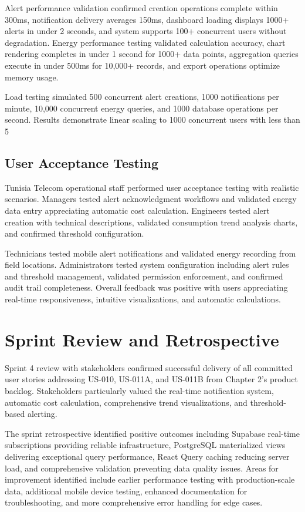 Alert performance validation confirmed creation operations complete within 300ms, notification delivery averages 150ms, dashboard loading displays 1000+ alerts in under 2 seconds, and system supports 100+ concurrent users without degradation. Energy performance testing validated calculation accuracy, chart rendering completes in under 1 second for 1000+ data points, aggregation queries execute in under 500ms for 10,000+ records, and export operations optimize memory usage.

Load testing simulated 500 concurrent alert creations, 1000 notifications per minute, 10,000 concurrent energy queries, and 1000 database operations per second. Results demonstrate linear scaling to 1000 concurrent users with less than 5%

\subsection{User Acceptance Testing}

Tunisia Telecom operational staff performed user acceptance testing with realistic scenarios. Managers tested alert acknowledgment workflows and validated energy data entry appreciating automatic cost calculation. Engineers tested alert creation with technical descriptions, validated consumption trend analysis charts, and confirmed threshold configuration.

Technicians tested mobile alert notifications and validated energy recording from field locations. Administrators tested system configuration including alert rules and threshold management, validated permission enforcement, and confirmed audit trail completeness. Overall feedback was positive with users appreciating real-time responsiveness, intuitive visualizations, and automatic calculations.

\section{Sprint Review and Retrospective}

Sprint 4 review with stakeholders confirmed successful delivery of all committed user stories addressing US-010, US-011A, and US-011B from Chapter 2's product backlog. Stakeholders particularly valued the real-time notification system, automatic cost calculation, comprehensive trend visualizations, and threshold-based alerting.

The sprint retrospective identified positive outcomes including Supabase real-time subscriptions providing reliable infrastructure, PostgreSQL materialized views delivering exceptional query performance, React Query caching reducing server load, and comprehensive validation preventing data quality issues. Areas for improvement identified include earlier performance testing with production-scale data, additional mobile device testing, enhanced documentation for troubleshooting, and more comprehensive error handling for edge cases.


